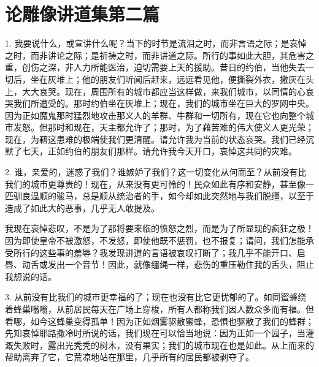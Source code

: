 

\section{论雕像讲道集第二篇}

\par

1. 我要说什么，或宣讲什么呢？当下的时节是流泪之时，而非言语之际；是哀悼之时，而非讲论之际；是祈祷之时，而非讲道之际。所行的事如此大胆，其危害之重，创伤之深，非人力所能医治，迫切需要上天的援助。昔日的约伯，当他失去一切后，坐在灰堆上；他的朋友们听闻后赶来，远远看见他，便撕裂外衣，撒灰在头上，大大哀哭。现在，周围所有的城市都应当这样做，来我们城市，以同情的心哀哭我们所遭受的。那时约伯坐在灰堆上；现在，我们的城市坐在巨大的罗网中央。因为正如魔鬼那时猛烈地攻击那义人的羊群、牛群和一切所有，现在它也向整个城市发怒。但那时和现在，天主都允许了；那时，为了藉苦难的伟大使义人更光荣；现在，为藉这患难的极端使我们更清醒。请允许我为当前的状态哀哭。我们已经沉默了七天，正如约伯的朋友们那样。请允许我今天开口，哀悼这共同的灾难。\par

2. 谁，亲爱的，迷惑了我们？谁嫉妒了我们？这一切变化从何而至？从前没有比我们的城市更尊贵的！现在，从来没有更可怜的！民众如此有序和安静，甚至像一匹驯良温顺的骏马，总是顺从统治者的手，如今却如此突然地与我们脱缰，以至于造成了如此大的恶事，几乎无人敢提及。\par

我现在哀悼悲叹，不是为了那将要来临的愤怒之烈，而是为了所显现的疯狂之极！因为即使皇帝不被激怒，不发怒，即使他既不惩罚，也不报复；请问，我们怎能承受所行的这些事的羞辱？我发现讲道的言语被哀叹打断了；我几乎不能开口、启唇、动舌或发出一个音节！因此，就像缰绳一样，悲伤的重压勒住我的舌头，阻止我想说的话。\par

3. 从前没有比我们的城市更幸福的了；现在也没有比它更忧郁的了。如同蜜蜂绕着蜂巢嗡嗡，从前居民每天在广场上穿梭，所有人都称我们因人数众多而有福。但看哪，如今这蜂巢变得孤单！因为正如烟雾驱散蜜蜂，恐惧也驱散了我们的蜂群；先知哀悼耶路撒冷时所说的话，我们现在可以恰当地说：因为正如一个园子，当灌溉失败时，露出光秃秃的树木，没有果实；我们的城市现在也是如此。从上而来的帮助离弃了它，它荒凉地站在那里，几乎所有的居民都被剥夺了。\par

